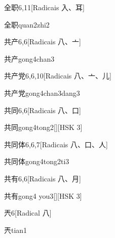 \begin{entry}{全职}{6,11}[Radicais ⼊、⽿]
  \begin{phonetics}{全职}{quan2zhi2}
  \end{phonetics}
\end{entry}

\begin{entry}{共产}{6,6}[Radicais ⼋、⼇]
  \begin{phonetics}{共产}{gong4chan3}
  \end{phonetics}
\end{entry}

\begin{entry}{共产党}{6,6,10}[Radicais ⼋、⼇、⼉]
  \begin{phonetics}{共产党}{gong4chan3dang3}
  \end{phonetics}
\end{entry}

\begin{entry}{共同}{6,6}[Radicais ⼋、⼝]
  \begin{phonetics}{共同}{gong4tong2}[][HSK 3]
  \end{phonetics}
\end{entry}

\begin{entry}{共同体}{6,6,7}[Radicais ⼋、⼝、⼈]
  \begin{phonetics}{共同体}{gong4tong2ti3}
  \end{phonetics}
\end{entry}

\begin{entry}{共有}{6,6}[Radicais ⼋、⽉]
  \begin{phonetics}{共有}{gong4 you3}[][HSK 3]
  \end{phonetics}
\end{entry}

\begin{entry}{兲}{6}[Radical ⼋]
  \begin{phonetics}{兲}{tian1}
  \end{phonetics}
\end{entry}

